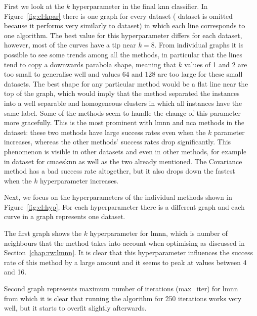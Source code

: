 \documentclass[12pt,a4paper]{report}
\begin{document}
First we look at the $k$ hyperparameter in the final \ac{knn} classifier. In Figure~\ref{fig:cl:kpar} there is one graph for every dataset ( dataset is omitted because it performs very similarly to  dataset) in which each line corresponds to one algorithm. The best value for this hyperparameter differs for each dataset, however, most of the curves have a tip near $k=8$. From individual graphs it is possible to see some trends among all the methods, in particular that the lines tend to copy a downwards parabola shape, meaning that $k$ values of 1 and 2 are too small to generalise well and values 64 and 128 are too large for these small datasets. The best shape for any particular method would be a flat line near the top of the graph, which would imply that the method separated the instances into a well separable and homogeneous clusters in which all instances have the same label. Some of the methods seem to handle the change of this parameter more gracefully. This is the most prominent with \ac{lmnn} and \ac{nca} methods in the  dataset: these two methods have large success rates even when the $k$ parameter increases, whereas the other methods' success rates drop significantly. This phenomenon is visible in other datasets and even in other methods, for example in  dataset for \ac{cmaesknn} as well as the two already mentioned. The Covariance method has a bad success rate altogether, but it also drops down the fastest when the $k$ hyperparameter increases.


Next, we focus on the hyperparameters of the individual methods shown in Figure~\ref{fig:cl:hyp}. For each hyperparameter there is a different graph and each curve in a graph represents one dataset.

The first graph shows the $k$ hyperparameter for \ac{lmnn}, which is number of neighbours that the method takes into account when optimising as discussed in Section~\ref{chap:rw:lmnn}. It is clear that this hyperparameter influences the success rate of this method by a large amount and it seems to peak at values between 4 and 16.

Second graph represents maximum number of iterations (max\_iter) for \ac{lmnn} from which it is clear that running the algorithm for 250 iterations works very well, but it starts to overfit slightly afterwards.
\end{document}
